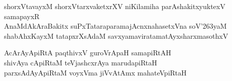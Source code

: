 \begin{entry}
\begin{shl}
shorxVtavayxM shorxVtarxvaketxrXV niKilamiha parAshakitxyuktexV samapayxR\\
AnaMdAkAraBakitx suPxTataraparamajAcnxnahasetxVna soV\char'263yaM\\
shabAhxKayxM tatapxrXsAdaM savxyamaviratamatAyxsharxmasothxV
\end{shl}
\smallskip
{}
\smallskip
\begin{shl}
AcArAyApiRtA paqthivxV guroVrApaH samapiRtAH\\
shivAya cApiRtaM teVjashcxrAya marudapiRtaH\\
parxsAdAyApiRtaM voyxVma jiVvAtAmx mahateVpiRtaH
\end{shl}
\smallskip
{}
\smallskip
\vskip 1pt
\end{entry}

